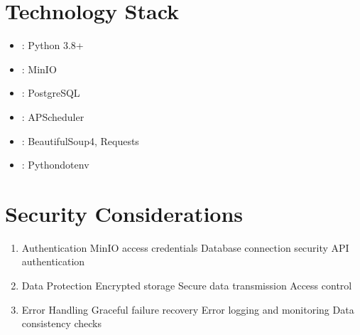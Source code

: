 \documentclass[letterpaper,10pt,english]{sphinxmanual}
\begin{document}
\section{Technology Stack}
\label{\detokenize{architecture:technology-stack}}\begin{itemize}
\item {} 
\sphinxAtStartPar
{}: Python 3.8+

\item {} 
\sphinxAtStartPar
{}: MinIO

\item {} 
\sphinxAtStartPar
{}: PostgreSQL

\item {} 
\sphinxAtStartPar
{}: APScheduler

\item {} 
\sphinxAtStartPar
{}: BeautifulSoup4, Requests

\item {} 
\sphinxAtStartPar
{}: Python\sphinxhyphen{}dotenv

\end{itemize}


\section{Security Considerations}
\label{\detokenize{architecture:security-considerations}}\begin{enumerate}
%
\item {} 
\sphinxAtStartPar
Authentication
\sphinxhyphen{} MinIO access credentials
\sphinxhyphen{} Database connection security
\sphinxhyphen{} API authentication

\item {} 
\sphinxAtStartPar
Data Protection
\sphinxhyphen{} Encrypted storage
\sphinxhyphen{} Secure data transmission
\sphinxhyphen{} Access control

\item {} 
\sphinxAtStartPar
Error Handling
\sphinxhyphen{} Graceful failure recovery
\sphinxhyphen{} Error logging and monitoring
\sphinxhyphen{} Data consistency checks

\end{enumerate}
\end{document}
